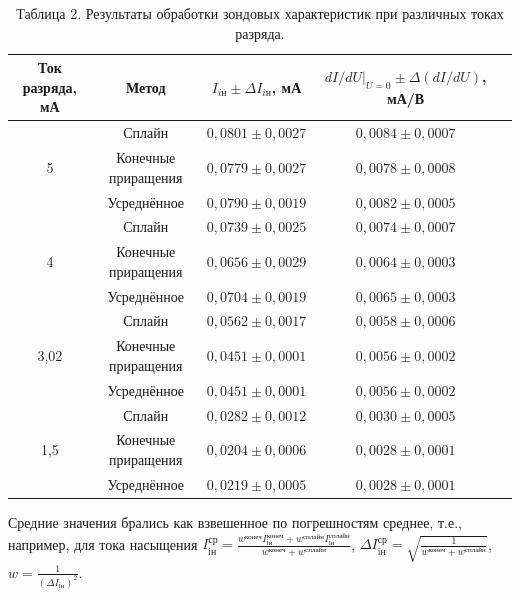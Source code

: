 \documentclass[a4paper]{article}
\begin{document}
\begin{enumerate}
\begin{table}[h!]
    \label{tab:probe_data}
    \begin{tabular}{|c|c|c|c|c|}
        \hline
        \textbf{Ток разряда, мА} & \textbf{Метод} & $I_{i\text{н}} \pm \Delta I_{i\text{н}}$, мА & $dI/dU|_{U=0} \pm \Delta (dI/dU)$, мА/В \\
        \hline
        \multirow{3}{*}{5} & Сплайн & $0{,}0801 \pm 0{,}0027$ & $0{,}0084 \pm 0{,}0007$ \\
        \cline{2-4}
         & Конечные приращения & $0{,}0779 \pm 0{,}0027$ & $0{,}0078 \pm 0{,}0008$ \\
        \cline{2-4}
         & Усреднённое & $0{,}0790 \pm 0{,}0019$ & $0{,}0082 \pm 0{,}0005$ \\
        \hline
        \multirow{3}{*}{4} & Сплайн & $0{,}0739 \pm 0{,}0025$ & $0{,}0074 \pm 0{,}0007$ \\
        \cline{2-4}
         & Конечные приращения & $0{,}0656 \pm 0{,}0029$ & $0{,}0064 \pm 0{,}0003$ \\
        \cline{2-4}
         & Усреднённое & $0{,}0704 \pm 0{,}0019$ & $0{,}0065 \pm 0{,}0003$ \\
        \hline
        \multirow{3}{*}{3,02} & Сплайн & $0{,}0562 \pm 0{,}0017$ & $0{,}0058 \pm 0{,}0006$ \\
        \cline{2-4}
         & Конечные приращения & $0{,}0451 \pm 0{,}0001$ & $0{,}0056 \pm 0{,}0002$ \\
        \cline{2-4}
         & Усреднённое & $0{,}0451 \pm 0{,}0001$ & $0{,}0056 \pm 0{,}0002$ \\
        \hline
        \multirow{3}{*}{1,5} & Сплайн & $0{,}0282 \pm 0{,}0012$ & $0{,}0030 \pm 0{,}0005$ \\
        \cline{2-4}
         & Конечные приращения & $0{,}0204 \pm 0{,}0006$ & $0{,}0028 \pm 0{,}0001$ \\
        \cline{2-4}
         & Усреднённое & $0{,}0219 \pm 0{,}0005$ & $0{,}0028 \pm 0{,}0001$ \\
        \hline
    \end{tabular}
    \caption{Таблица 2. Результаты обработки зондовых характеристик при различных токах разряда.}
\end{table}

Средние значения брались как взвешенное по погрешностям среднее, т.е., например, для тока насыщения $I_{\text{iн}}^{\text{ср}} = \frac{w^{\text{конеч}} I_{\text{iн}}^{\text{конеч}} +w^{\text{сплайн}} I_{\text{iн}}^{\text{сплайн}}}{w^{\text{конеч}} + w^{\text{сплайн}}}$, $\Delta I_{\text{iн}}^{\text{ср}} = \sqrt{\frac{1}{w^{\text{конеч}} + w^{\text{сплайн}}}}$, $w = \frac{1}{\left(\Delta I_{\text{iн}} \right)^2}$.


\end{enumerate}
\end{document}
